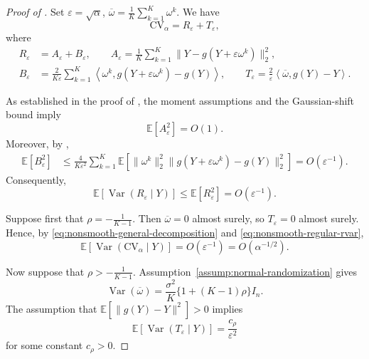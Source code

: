 \documentclass[12pt]{article}
\def\E{\mathbb{E}}
\theoremstyle{general}
\newcommand{\cv}{{\mathrm{CV}}}
\begin{document}
\begin{proof}[Proof of ]
Set $\varepsilon=\sqrt{\alpha}$,
$\overline\omega=\frac1K\sum_{k=1}^K\omega^k$.
We have
\begin{equation}
\label{eq:nonsmooth-general-decomposition}
\cv_\alpha
=
R_\varepsilon+T_\varepsilon,
\end{equation}
where
\begin{align*}
R_\varepsilon
&=
A_\varepsilon+B_\varepsilon,\qquad
A_\varepsilon=
\frac1K\sum_{k=1}^K
\|Y-g(Y+\varepsilon\omega^k)\|_2^2,\\
B_\varepsilon
&=
\frac{2}{K\varepsilon}
\sum_{k=1}^K
\left\langle
\omega^k,
g(Y+\varepsilon\omega^k)-g(Y)
\right\rangle,\qquad
T_\varepsilon
=
\frac{2}{\varepsilon}
\left\langle
\overline\omega,
g(Y)-Y
\right\rangle.
\end{align*}

As established in the proof of ,
the moment assumptions and the Gaussian-shift bound imply
\[
\mathbb E[A_\varepsilon^2]=O(1).
\]
Moreover, by ,
\begin{align*}
\mathbb E[B_\varepsilon^2]
&\leq
\frac{4}{K\varepsilon^2}
\sum_{k=1}^K
\mathbb E\!\left[
\|\omega^k\|_2^2
\|g(Y+\varepsilon\omega^k)-g(Y)\|_2^2
\right]=
O(\varepsilon^{-1}).
\end{align*}
Consequently,
\begin{equation}
\label{eq:nonsmooth-regular-rvar}
\mathbb E\!\left[
\operatorname{Var}(R_\varepsilon\mid Y)
\right]
\leq
\mathbb E[R_\varepsilon^2]
=
O(\varepsilon^{-1}).
\end{equation}

Suppose first that
$\rho=-\frac{1}{K-1}$.
Then \(\overline\omega=0\) almost surely, so
\(T_\varepsilon=0\) almost surely. Hence,
by \eqref{eq:nonsmooth-general-decomposition} and
\eqref{eq:nonsmooth-regular-rvar},
\[
\mathbb E\!\left[
\operatorname{Var}(\cv_\alpha\mid Y)
\right]
=
O(\varepsilon^{-1})
=
O(\alpha^{-1/2}).
\]

Now suppose that
$\rho>-\frac{1}{K-1}$.
Assumption~\ref{assump:normal-randomization} gives
\[
\operatorname{Var}(\overline\omega)
=
\frac{\sigma^2}{K}
\{1+(K-1)\rho\}I_n.
\]
The assumption that $\E[\|g(Y)-Y\|^2]>0$ implies
\begin{equation}
\label{eq:nonsmooth-singular-rvar}
\mathbb E\!\left[
\operatorname{Var}(T_\varepsilon\mid Y)
\right]
=
\frac{c_\rho}{\varepsilon^2}
\end{equation}
for some constant \(c_\rho>0\).


\end{proof}
\end{document}
